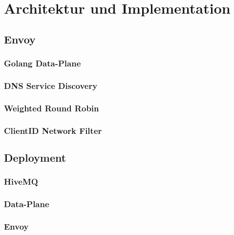 \section{Architektur und Implementation}

\subsection{Envoy}
\subsubsection{Golang Data-Plane}
\subsubsection{DNS Service Discovery}
\subsubsection{Weighted Round Robin}
\subsubsection{ClientID Network Filter}

\subsection{Deployment}
\subsubsection{HiveMQ}
\subsubsection{Data-Plane}
\subsubsection{Envoy}

